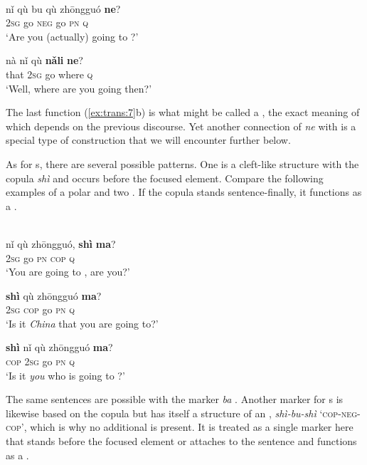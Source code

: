 \ea%
    \label{ex:trans:7}
    \\
    \ea
    \gll nǐ  qù  bu  qù  zhōngguó \textbf{{ne}}?\\
    2\textsc{sg}  go  \textsc{neg}  go  \textsc{pn}    \textsc{q}\\
    \glt ‘Are you (actually) going to ?’
    
    \ex
    \gll nà  nǐ  qù \textbf{{nǎli}} \textbf{{ne}}?\\
    that  2\textsc{sg}  go  where  \textsc{q}\\
    \glt ‘Well, where are you going then?’
    \z
    \z

\noindent The last function (\ref{ex:trans:7}b) is what might be called a , the exact meaning of which depends on the previous discourse. Yet another connection of \textit{ne}  with  is a special type of  construction that we will encounter further below.

As for s, there are several possible patterns. One is a cleft-like structure with the copula \textit{shì}  and occurs before the focused element. Compare the following examples of a polar and two  . If the copula stands sentence-finally, it functions as a .

\ea%
    \label{ex:trans:8}
    \\
    \ea
    \gll nǐ  qù  zhōngguó, \textbf{{shì}} \textbf{{ma}}?\\
    2\textsc{sg}  go  \textsc{pn}    \textsc{cop}  \textsc{q}\\
    \glt ‘You are going to , are you?’
    
    \ex
     \textbf{{shì}} qù  zhōngguó \textbf{{ma}}?\\
    2\textsc{sg}  \textsc{cop}  go  \textsc{pn}    \textsc{q}\\
    \glt ‘Is it \textit{China} that you are going to?’
    
    \ex
    \gll \textbf{{shì}} nǐ  qù  zhōngguó \textbf{{ma}}?\\
    \textsc{cop}  2\textsc{sg}  go  \textsc{pn}    \textsc{q}\\
    \glt ‘Is it \textit{you} who is going to ?’\z\z

\noindent The same sentences are possible with the marker \textit{ba} . Another marker for s is likewise based on the copula but has itself a structure of an , \textit{shì-bu-shì}  ‘\textsc{cop}-\textsc{neg}-\textsc{cop}’, which is why no additional  is present. It is treated as a single marker here that stands before the focused element or attaches to the sentence and functions as a .


